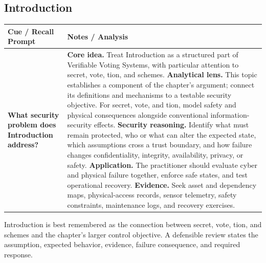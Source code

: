 \documentclass[11pt]{article}
\newcommand{\CornellHeader}{%
\rowcolor{Navy}\color{white}\bfseries Cue / Recall Prompt & \color{white}\bfseries Notes / Analysis\\\hline}
\newcommand{\CornellRow}[2]{%
\cellcolor{CueGray}\RaggedRight\textbf{#1} & \RaggedRight #2\\\hline}
\begin{document}
\subsection*{Introduction}
\begin{longtable}{>{\RaggedRight\arraybackslash}p{}|>{\RaggedRight\arraybackslash}p{}}
\CornellHeader
\CornellRow{What security problem does Introduction address?}{\textbf{Core idea.} Treat Introduction as a structured part of Verifiable Voting Systems, with particular attention to secret, vote, tion, and schemes. \textbf{Analytical lens.} This topic establishes a component of the chapter's argument; connect its definitions and mechanisms to a testable security objective. For secret, vote, and tion, model safety and physical consequences alongside conventional information-security effects. \textbf{Security reasoning.} Identify what must remain protected, who or what can alter the expected state, which assumptions cross a trust boundary, and how failure changes confidentiality, integrity, availability, privacy, or safety. \textbf{Application.} The practitioner should evaluate cyber and physical failure together, enforce safe states, and test operational recovery. \textbf{Evidence.} Seek asset and dependency maps, physical-access records, sensor telemetry, safety constraints, maintenance logs, and recovery exercises.}
\end{longtable}
\begin{topicsummary}
Introduction is best remembered as the connection between secret, vote, tion, and schemes and the chapter's larger control objective. A defensible review states the assumption, expected behavior, evidence, failure consequence, and required response.
\end{topicsummary}
\end{document}
